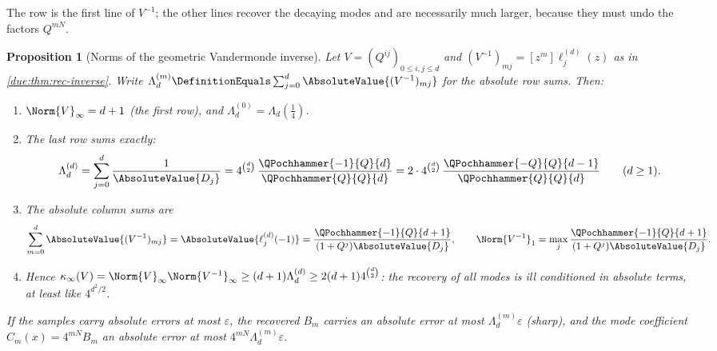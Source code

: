 \documentclass[11pt,oneside]{article}
\theoremstyle{plain}
\newtheorem{proposition}[theorem]{Proposition}
\theoremstyle{definition}
\theoremstyle{remark}
\newcommand{\Qq}{Q}                                         %
\newcommand{\Cr}[2]{C_{#1}\!\left(#2\right)}                %
\begin{document}
The row is the first line of $V^{-1}$; the other lines recover the decaying
modes and are necessarily much larger, because they must undo the factors
$\Qq^{mN}$.

\begin{proposition}[Norms of the geometric Vandermonde inverse]
\label{due:prop:stab-vandermonde}
Let $V=(\Qq^{ij})_{0\le i,j\le d}$ and
$(V^{-1})_{mj}=[z^{m}]\ell^{(d)}_{j}(z)$ as in \cref{due:thm:rec-inverse}.
Write $\Lambda^{(m)}_{d}\DefinitionEquals\sum_{j=0}^{d}\AbsoluteValue{(V^{-1})_{mj}}$
for the absolute row sums.  Then:
\begin{enumerate}
\item $\Norm{V}_{\infty}=d+1$ (the first row), and
 $\Lambda^{(0)}_{d}=\Lambda_{d}(\tfrac14)$.
\item The last row sums exactly:
 \begin{equation}
  \Lambda^{(d)}_{d}=\sum_{j=0}^{d}\frac{1}{\AbsoluteValue{D_{j}}}
  =4^{\binom{d}{2}}\,\frac{\QPochhammer{-1}{\Qq}{d}}{\QPochhammer{\Qq}{\Qq}{d}}
  =2\cdot4^{\binom{d}{2}}\,\frac{\QPochhammer{-\Qq}{\Qq}{d-1}}{\QPochhammer{\Qq}{\Qq}{d}}
  \qquad(d\ge1).
  \label{due:eq:stab-lastrow}
 \end{equation}
\item The absolute column sums are
 \begin{equation}
  \sum_{m=0}^{d}\AbsoluteValue{(V^{-1})_{mj}}
  =\AbsoluteValue{\ell^{(d)}_{j}(-1)}
  =\frac{\QPochhammer{-1}{\Qq}{d+1}}{(1+\Qq^{j})\AbsoluteValue{D_{j}}},
  \qquad
  \Norm{V^{-1}}_{1}=\max_{j}\frac{\QPochhammer{-1}{\Qq}{d+1}}{(1+\Qq^{j})\AbsoluteValue{D_{j}}}.
  \label{due:eq:stab-columns}
 \end{equation}
\item Hence
 $\kappa_{\infty}(V)=\Norm{V}_{\infty}\Norm{V^{-1}}_{\infty}
 \ge(d+1)\Lambda^{(d)}_{d}\ge2(d+1)4^{\binom d2}$: the recovery of all
 modes is ill conditioned in absolute terms, at least like $4^{d^{2}/2}$.
\end{enumerate}
If the samples carry absolute errors at most $\varepsilon$, the recovered
$B_{m}$ carries an absolute error at most $\Lambda^{(m)}_{d}\varepsilon$
(sharp), and the mode coefficient $\Cr{m}{x}=4^{mN}B_{m}$ an absolute error
at most $4^{mN}\Lambda^{(m)}_{d}\varepsilon$.
\end{proposition}
\end{document}
